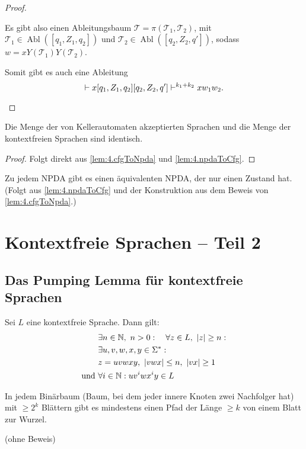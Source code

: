 \begin{proof}
\begin{description}
\begin{itemize}
      Es gibt also einen Ableitungsbaum $\mathcal{T} = \pi(\mathcal{T}_1,\mathcal{T}_2)$, mit $\mathcal{T}_1 \in \operatorname{Abl}([q_1, Z_1, q_2])$ und $\mathcal{T}_2 \in \operatorname{Abl}([q_2, Z_2, q'])$, sodass $w = xY(\mathcal{T}_1)Y(\mathcal{T}_2)$.
      
      Somit gibt es auch eine Ableitung
      \begin{equation*}
      [q, Z, q'] \vdash x[q_1,Z_1,q_2][q_2, Z_2, q'] \vdash^{k_1+k_2} xw_1w_2. \qedhere
      \end{equation*}
      \end{itemize}
     \end{description}
\end{proof}

\begin{Satz}
Die Menge der von Kellerautomaten akzeptierten Sprachen und die Menge der kontextfreien Sprachen sind identisch.
\end{Satz}
\begin{proof}
Folgt direkt aus \autoref{lem:4.cfgToNpda} und \autoref{lem:4.npdaToCfg}.
\end{proof}

\begin{Bemerkung}
Zu jedem \ac{NPDA} gibt es einen äquivalenten \ac{NPDA}, der nur einen Zustand hat.
(Folgt aus \autoref{lem:4.npdaToCfg} und der Konstruktion aus dem Beweis von \autoref{lem:4.cfgToNpda}.)
\end{Bemerkung}



\section{Kontextfreie Sprachen -- Teil 2}

\subsection{Das Pumping Lemma für kontextfreie Sprachen}
\begin{Satz}
\label{satz:PL für CFL}
	Sei $L$ eine kontextfreie Sprache. Dann gilt:
	        \begin{alignat*}{2}
                &\exists n\in\N,\ n>0:\quad \forall z\in L,\ |z|\geq n:\\
                &\exists u,v,w,x,y\in\Sigma^* :\\
                &z = uvwxy,\ |vwx| \leq n,\ |vx| \geq 1\\
                \text{und }& \forall i\in\N: uv^iwx^iy\in L
        \qedhere
        \end{alignat*}
\end{Satz}
\begin{lemma}\label{lemma:Binärbaum}
 In jedem Binärbaum (Baum, bei dem jeder innere Knoten zwei Nachfolger hat) mit $\geq 2^k$ Blättern gibt es mindestens einen Pfad der Länge $\geq k$ von einem Blatt zur Wurzel.
\end{lemma}
(ohne Beweis)

